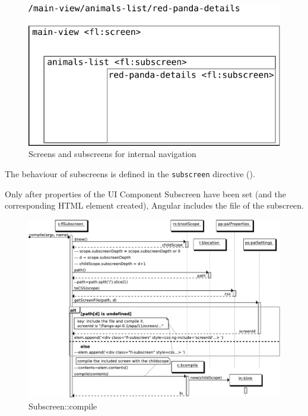 \begin{figure}[htb]
    \centering
    \includegraphics{figures/design/internal-navigation.pdf}
    \caption{Screens and subscreens for internal navigation}
    \label{fig:design-internal-navigation}
\end{figure}

The behaviour of subscreens is defined in the \texttt{subscreen} directive ().

Only after properties of the UI Component Subscreen have been set (and the corresponding \ac{HTML} element created), Angular includes the file of the subscreen.

\begin{figure}
    \centering
    \includegraphics{figures/design/seqdia/subscreen-compile.pdf}
    \caption{Subscreen::compile}
    \label{fig:design-seqdia-subscreen-compile}
\end{figure}

